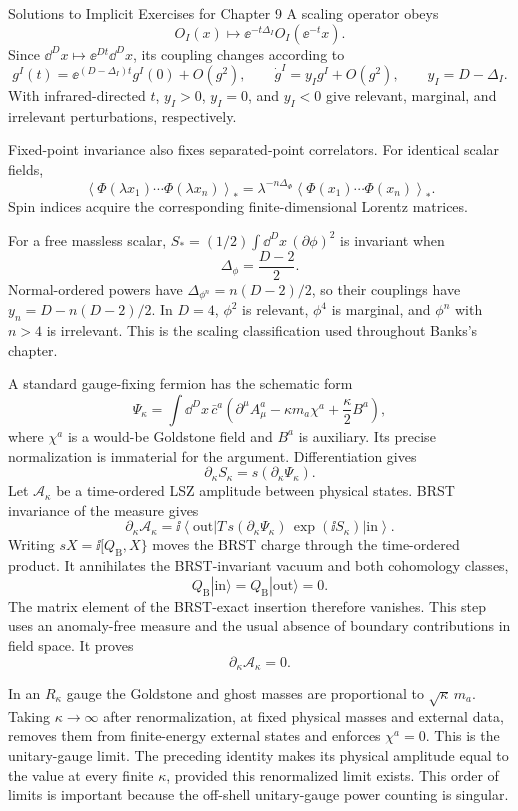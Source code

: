 \begin{bankssolutions}{Solutions to Implicit Exercises for Chapter 9}
A scaling operator obeys
\[
  O_I(x)\longmapsto \ee^{-t\Delta_I}O_I(\ee^{-t}x).
\]
Since $\dd^D x\mapsto\ee^{Dt}\dd^D x$, its coupling changes according to
\[
  g^I(t)=\ee^{(D-\Delta_I)t}g^I(0)+O(g^2),
  \qquad \dot g^I=y_Ig^I+O(g^2),
  \qquad y_I=D-\Delta_I.
\]
With infrared-directed $t$, $y_I>0$, $y_I=0$, and $y_I<0$ give relevant,
marginal, and irrelevant perturbations, respectively.

Fixed-point invariance also fixes separated-point correlators.  For identical
scalar fields,
\[
  \left\langle\Phi(\lambda x_1)\cdots\Phi(\lambda x_n)\right\rangle_*
  =\lambda^{-n\Delta_\Phi}
  \left\langle\Phi(x_1)\cdots\Phi(x_n)\right\rangle_*.
\]
Spin indices acquire the corresponding finite-dimensional Lorentz matrices.

For a free massless scalar,
$S_*=(1/2)\int\dd^D x\,(\partial\phi)^2$ is invariant when
\[
  \Delta_\phi=\frac{D-2}{2}.
\]
Normal-ordered powers have
$\Delta_{\phi^n}=n(D-2)/2$, so their couplings have
$y_n=D-n(D-2)/2$.  In $D=4$, $\phi^2$ is relevant, $\phi^4$ is marginal,
and $\phi^n$ with $n>4$ is irrelevant.  This is the scaling classification
used throughout Banks's chapter.

A standard gauge-fixing fermion has the schematic form
\[
  \Psi_\kappa=\int\dd^D x\,\bar c^a
  \left(\partial^\mu A^a_\mu-\kappa m_a\chi^a
        +\frac{\kappa}{2}B^a\right),
\]
where $\chi^a$ is a would-be Goldstone field and $B^a$ is auxiliary.  Its
precise normalization is immaterial for the argument.  Differentiation gives
\[
  \partial_\kappa S_\kappa=s(\partial_\kappa\Psi_\kappa).
\]
Let $\mathcal A_\kappa$ be a time-ordered LSZ amplitude between physical
states.  BRST invariance of the measure gives
\[
  \partial_\kappa\mathcal A_\kappa
  =\ii\left\langle\mathrm{out}\left|
  T\,s(\partial_\kappa\Psi_\kappa)\,
  \exp(\ii S_\kappa)\right|\mathrm{in}\right\rangle.
\]
Writing $sX=\ii[Q_{\mathrm B},X\}$ moves the BRST charge through the
time-ordered product.  It annihilates the BRST-invariant vacuum and both
cohomology classes,
\[
  Q_{\mathrm B}|\mathrm{in}\rangle=Q_{\mathrm B}|\mathrm{out}\rangle=0.
\]
The matrix element of the BRST-exact insertion therefore vanishes.  This step
uses an anomaly-free measure and the usual absence of boundary contributions
in field space.  It proves
\[
  \partial_\kappa\mathcal A_\kappa=0.
\]

In an $R_\kappa$ gauge the Goldstone and ghost masses are proportional to
$\sqrt{\kappa}\,m_a$.  Taking $\kappa\to\infty$ after renormalization, at fixed
physical masses and external data, removes them from finite-energy external
states and enforces $\chi^a=0$.  This is the unitary-gauge limit.  The preceding
identity makes its physical amplitude equal to the value at every finite
$\kappa$, provided this renormalized limit exists.  This order of limits is
important because the off-shell unitary-gauge power counting is singular.


\end{bankssolutions}
